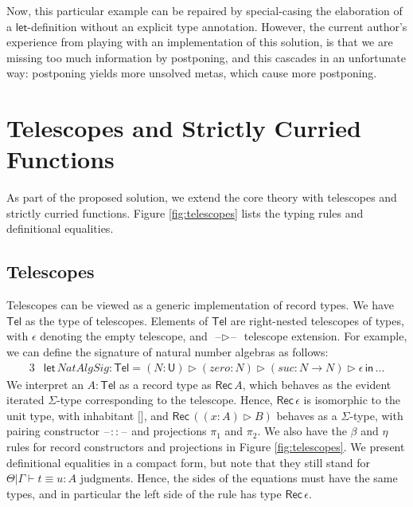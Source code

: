 \documentclass[acmsmall,review,anonymous,prologue,dvipsnames]{acmart}\settopmatter{printfolios=true,printccs=false,printacmref=false}
\newcommand{\slet}{\boldsymbol{\mathsf{let}}}
\renewcommand{\sin}{\boldsymbol{\mathsf{in}}}
\renewcommand{\U}{\mathsf{U}}
\newcommand{\blank}{\mathord{\hspace{1pt}\text{--}\hspace{1pt}}}
\newcommand{\Tel}{\mathsf{Tel}}
\newcommand{\TCons}{\triangleright}
\newcommand{\Rec}{\mathsf{Rec}}
\theoremstyle{remark}
\begin{document}
Now, this particular example can be repaired by special-casing the elaboration
of a $\slet$-definition without an explicit type annotation. However, the
current author's experience from playing with an implementation of this
solution, is that we are missing too much information by postponing, and this
cascades in an unfortunate way: postponing yields more unsolved metas, which
cause more postponing.

\section{Telescopes and Strictly Curried Functions}

As part of the proposed solution, we extend the core theory with telescopes and
strictly curried functions. Figure \ref{fig:telescopes} lists the typing rules and
definitional equalities.

\subsection{Telescopes}
Telescopes can be viewed as a generic implementation of record types. We have
$\Tel$ as the type of telescopes. Elements of $\Tel$ are right-nested telescopes
of types, with $\epsilon$ denoting the empty telescope, and $\blank\TCons\blank$
telescope extension. For example, we can define the signature of natural number
algebras as follows:
\begin{alignat*}{3}
  & \slet\,NatAlgSig : \Tel = (N : \U) \TCons (zero : N) \TCons (suc : N \to N) \TCons \epsilon\,\sin\,...
\end{alignat*}
We interpret an $A : \Tel$ as a record type as $\Rec\,A$, which behaves as the
evident iterated $\Sigma$-type corresponding to the telescope. Hence,
$\Rec\,\epsilon$ is isomorphic to the unit type, with inhabitant ${[}{]}$, and
$\Rec\,((x : A) \TCons B)$ behaves as a $\Sigma$-type, with pairing constructor
$\blank::\blank$ and projections $\pi_1$ and $\pi_2$. We also have the $\beta$
and $\eta$ rules for record constructors and projections in Figure
\ref{fig:telescopes}. We present definitional equalities in a compact form, but
note that they still stand for $\boxed{\Theta|\Gamma\vdash t \equiv u : A}$
judgments. Hence, the sides of the equations must have the same types, and in
particular the left side of the \LabTirName{${[}{]}$-$\eta$} rule has type
$\Rec\,\epsilon$.
\end{document}
